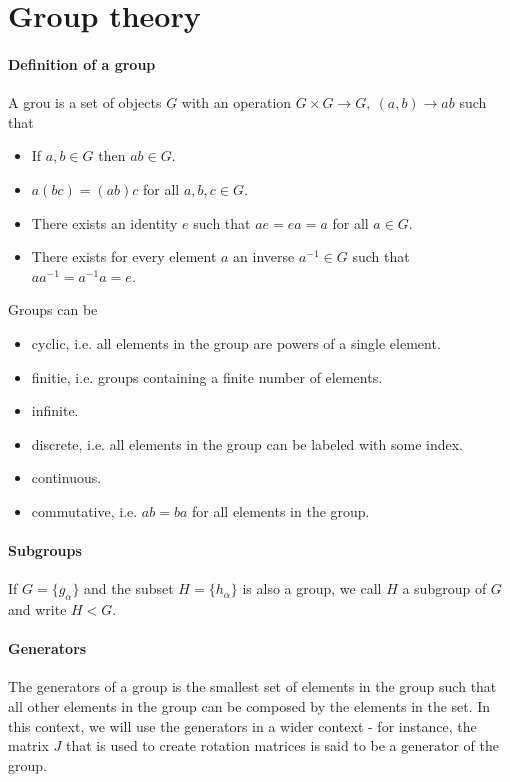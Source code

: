 \section{Group theory}

\paragraph{Definition of a group}
A grou is a set of objects $G$ with an operation $G\times G\to G,\ (a, b)\to ab$ such that
\begin{itemize}
	\item If $a, b\in G$ then $ab\in G$.
	\item $a(bc) = (ab)c$ for all $a, b, c\in G$.
	\item There exists an identity $e$ such that $ae = ea = a$ for all $a\in G$.
	\item There exists for every element $a$ an inverse $a^{-1}\in G$ such that $aa^{-1} = a^{-1}a = e$.
\end{itemize}
Groups can be
\begin{itemize}
	\item cyclic, i.e. all elements in the group are powers of a single element.
	\item finitie, i.e. groups containing a finite number of elements.
	\item infinite.
	\item discrete, i.e. all elements in the group can be labeled with some index.
	\item continuous.
	\item commutative, i.e. $ab = ba$ for all elements in the group.
\end{itemize}

\paragraph{Subgroups}
If $G = \{g_{\alpha}\}$ and the subset $H = \{h_{\alpha}\}$ is also a group, we call $H$ a subgroup of $G$ and write $H < G$.

\paragraph{Generators}
The generators of a group is the smallest set of elements in the group such that all other elements in the group can be composed by the elements in the set. In this context, we will use the generators in a wider context - for instance, the matrix $J$ that is used to create rotation matrices is said to be a generator of the group.

